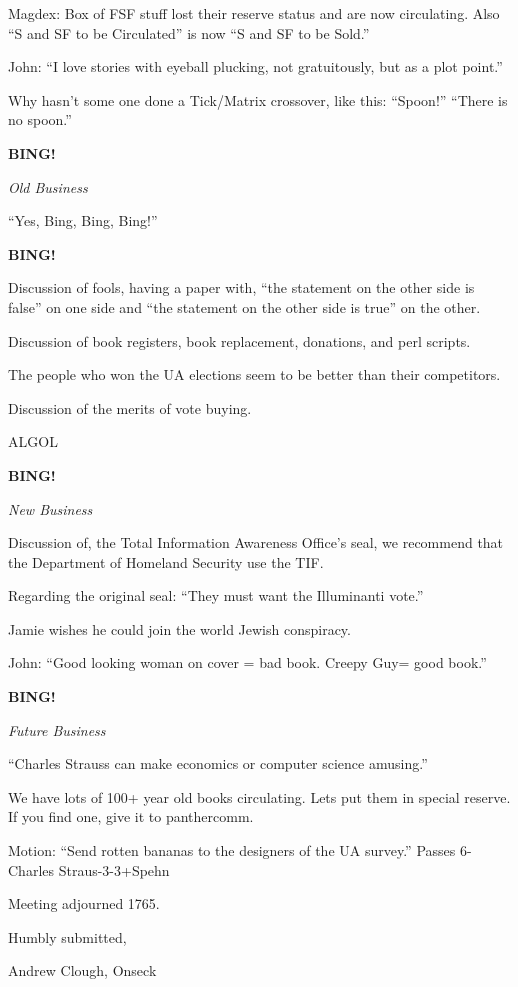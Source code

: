 \documentclass[12pt]{article}
\newcommand{\bing}{{\bf BING!} }
\newcommand{\goto}[1]{\bing \vskip 12pt \centerline{{\em{#1}}}}
\begin{document}
Magdex:  Box of FSF stuff lost their reserve status and are now circulating.  Also ``S and SF to be Circulated'' is now ``S and SF to be Sold.''

John:  ``I love stories with eyeball plucking, not gratuitously, but as a plot point.''

Why hasn't some one done a Tick/Matrix crossover, like this:  ``Spoon!''  ``There is no spoon.''


\goto{Old Business}

``Yes, Bing, Bing, Bing!''

\bing

Discussion of fools, having a paper with, ``the statement on the other side is false'' on one side and ``the statement on the other side is true'' on the other.

Discussion of book registers, book replacement, donations, and perl scripts.

The people who won the UA elections seem to be better than their competitors.

Discussion of the merits of vote buying.

ALGOL

\goto{New Business}

Discussion of, the Total Information Awareness Office's seal, we recommend that the Department of Homeland Security use the TIF.

Regarding the original seal:  ``They must want the Illuminanti vote.''

Jamie wishes he could join the world Jewish conspiracy.

John:  ``Good looking woman on cover = bad book.  Creepy Guy= good book.''

\goto{Future Business}

``Charles Strauss can make economics or computer science amusing.''

We have lots of 100+ year old books circulating.  Lets put them in special reserve.  If you find one, give it to panthercomm.

Motion:  ``Send rotten bananas to the designers of the UA survey.''  Passes 6-Charles Straus-3-3+Spehn

\vspace{12pt}

\noindent
Meeting adjourned 1765.

\vspace{18pt}

\centerline{Humbly submitted,}
\centerline{Andrew Clough, Onseck}
\end{document}
